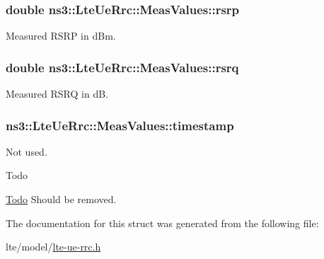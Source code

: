 \subsubsection[{\texorpdfstring{rsrp}{rsrp}}]{\setlength{\rightskip}{0pt plus 5cm}double ns3\+::\+Lte\+Ue\+Rrc\+::\+Meas\+Values\+::rsrp}\hypertarget{structns3_1_1LteUeRrc_1_1MeasValues_a4ef2eff7d2e96bb12849911b442531b1}{}\label{structns3_1_1LteUeRrc_1_1MeasValues_a4ef2eff7d2e96bb12849911b442531b1}


Measured R\+S\+RP in d\+Bm. 

\subsubsection[{\texorpdfstring{rsrq}{rsrq}}]{\setlength{\rightskip}{0pt plus 5cm}double ns3\+::\+Lte\+Ue\+Rrc\+::\+Meas\+Values\+::rsrq}\hypertarget{structns3_1_1LteUeRrc_1_1MeasValues_ae959ce8b2053f9a594372d8ea8deb712}{}\label{structns3_1_1LteUeRrc_1_1MeasValues_ae959ce8b2053f9a594372d8ea8deb712}


Measured R\+S\+RQ in dB. 

\subsubsection[{\texorpdfstring{timestamp}{timestamp}}]{ ns3\+::\+Lte\+Ue\+Rrc\+::\+Meas\+Values\+::timestamp}\hypertarget{structns3_1_1LteUeRrc_1_1MeasValues_acf9ca07effa6ebcfa8a16fd0df1e35d7}{}\label{structns3_1_1LteUeRrc_1_1MeasValues_acf9ca07effa6ebcfa8a16fd0df1e35d7}


Not used. 

\begin{DoxyRefDesc}{Todo}
\item[\hyperlink{todo__todo000105}{Todo}]Should be removed. \end{DoxyRefDesc}


The documentation for this struct was generated from the following file\+:\begin{DoxyCompactItemize}
\item 
lte/model/\hyperlink{lte-ue-rrc_8h}{lte-\/ue-\/rrc.\+h}\end{DoxyCompactItemize}
